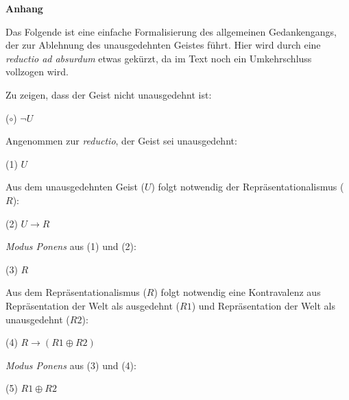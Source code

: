 \documentclass[a4paper, 12pt]{article}
\begin{document}
\newpage
\noindent\textbf{Anhang}
\vspace{6pt}

\noindent Das Folgende ist eine einfache Formalisierung des allgemeinen Gedankengangs, der zur Ablehnung des unausgedehnten Geistes führt. Hier wird durch eine \emph{reductio ad absurdum} etwas gekürzt, da im Text noch ein Umkehrschluss vollzogen wird. 

\vspace{14pt}

\noindent Zu zeigen, dass der Geist nicht unausgedehnt ist:

\vspace{4pt}
($\circ$) \hspace*{1em} $\neg U$

\vspace{4pt}
\noindent Angenommen zur \emph{reductio}, der Geist sei unausgedehnt:

\vspace{4pt}
(1) \hspace*{1em} $U$

\vspace{4pt}
\noindent Aus dem unausgedehnten Geist ($U$) folgt notwendig der Repräsentationalismus ($R$):  

\vspace{4pt}
(2) \hspace*{1em}  $U \rightarrow R$

\vspace{4pt}
\noindent \emph{Modus Ponens} aus (1) und (2):

\vspace{4pt}
(3) \hspace*{1em} $R$

\vspace{4pt}
\noindent Aus dem Repräsentationalismus ($R$) folgt notwendig eine Kontravalenz aus Repräsentation der Welt als ausgedehnt ($R1$) und Repräsentation der Welt als unausgedehnt ($R2$):

\vspace{4pt}
(4) \hspace*{1em} $R \rightarrow (R1 \oplus R2)$


\vspace{4pt}
\noindent \emph{Modus Ponens} aus (3) und (4):

\vspace{4pt}
(5) \hspace*{1em} $R1 \oplus R2$

\vspace{4pt}
\end{document}
